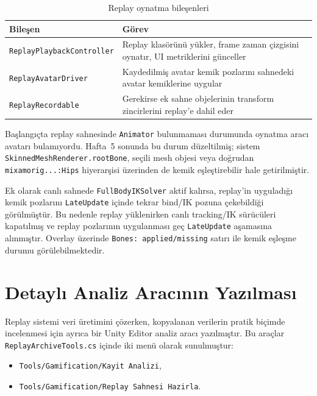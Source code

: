 \documentclass[11pt,a4paper]{article}
\begin{document}
\begin{table}[H]
\centering
\caption{Replay oynatma bileşenleri}
\label{tab:replay_components}
\renewcommand{\arraystretch}{1.22}
\begin{tabularx}{\textwidth}{lX}
\toprule
\textbf{Bileşen} & \textbf{Görev} \\
\midrule
\texttt{ReplayPlaybackController} & Replay klasörünü yükler, frame zaman çizgisini oynatır, UI metriklerini günceller \\
\texttt{ReplayAvatarDriver} & Kaydedilmiş avatar kemik pozlarını sahnedeki avatar kemiklerine uygular \\
\texttt{ReplayRecordable} & Gerekirse ek sahne objelerinin transform zincirlerini replay'e dahil eder \\
\bottomrule
\end{tabularx}
\end{table}

Başlangıçta replay sahnesinde \texttt{Animator} bulunmaması durumunda oynatma
aracı avatarı bulamıyordu. Hafta~5 sonunda bu durum düzeltilmiş; sistem
\texttt{SkinnedMeshRenderer.rootBone}, seçili mesh objesi veya doğrudan
\texttt{mixamorig...:Hips} hiyerarşisi üzerinden de kemik eşleştirebilir hale
getirilmiştir.

Ek olarak canlı sahnede \texttt{FullBodyIKSolver} aktif kalırsa, replay'in
uyguladığı kemik pozlarını \texttt{LateUpdate} içinde tekrar bind/IK pozuna
çekebildiği görülmüştür. Bu nedenle replay yüklenirken canlı tracking/IK
sürücüleri kapatılmış ve replay pozlarının uygulanması geç \texttt{LateUpdate}
aşamasına alınmıştır. Overlay üzerinde \texttt{Bones: applied/missing} satırı
ile kemik eşleşme durumu görülebilmektedir.

\section{Detaylı Analiz Aracının Yazılması}
\label{sec:analiz}

Replay sistemi veri üretimini çözerken, kopyalanan verilerin pratik biçimde
incelenmesi için ayrıca bir Unity Editor analiz aracı yazılmıştır. Bu araçlar
\texttt{ReplayArchiveTools.cs} içinde iki menü olarak sunulmuştur:

\begin{itemize}[nosep]
    \item \texttt{Tools/Gamification/Kayit Analizi},
    \item \texttt{Tools/Gamification/Replay Sahnesi Hazirla}.
\end{itemize}
\end{document}
